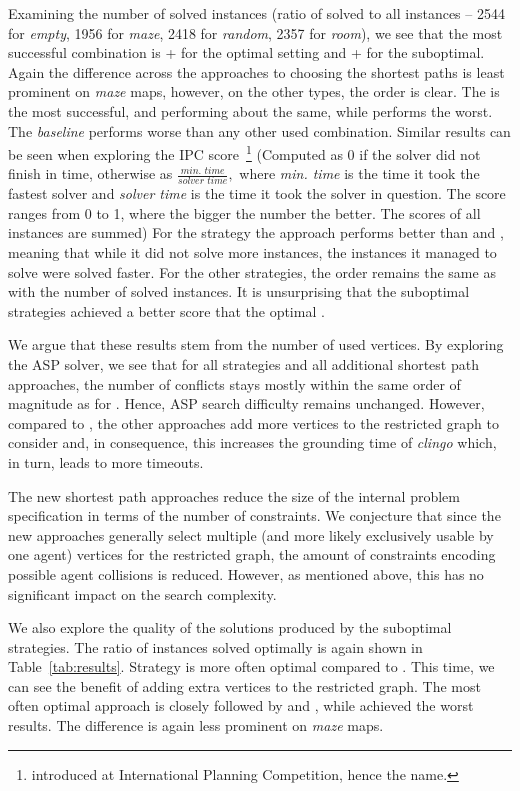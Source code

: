 Examining the number of solved instances (ratio of solved to all instances -- 2544 for \emph{empty}, 1956 for \emph{maze}, 2418 for \emph{random}, 2357 for \emph{room}), we see that the most successful combination is \ssp{} + \pss{} for the optimal setting and \ssc{} + \pss{} for the suboptimal. Again the difference across the approaches to choosing the shortest paths is least prominent on \emph{maze} maps, however, on the other types, the order is clear. The \pss{} is the most successful, \psd{} and \psr{} performing about the same, while \psa{} performs the worst. The \emph{baseline} \ssb{} performs worse than any other used combination.
Similar results can be seen when exploring the IPC score~\footnote{introduced at International Planning Competition, hence the name.} (Computed as 0 if the solver did not finish in time, otherwise as $\frac{\textit{min. time}}{\textit{solver time}},$ where \textit{min. time} is the time it took the fastest solver and \textit{solver time} is the time it took the solver in question. The score ranges from 0 to 1, where the bigger the number the better. The scores of all instances are summed) For the \ssp{} strategy the \psa{} approach performs better than \psd{} and \psr{}, meaning that while it did not solve more instances, the instances it managed to solve were solved faster. For the other strategies, the order remains the same as with the number of solved instances. It is unsurprising that the suboptimal strategies achieved a better score that the optimal \ssp{}.

We argue that these results stem from the number of used vertices. By exploring the ASP solver, we see that for all strategies and all additional shortest path approaches, the number of conflicts stays mostly within the same order of magnitude as for \pss{}. Hence, ASP search difficulty remains unchanged.
However, compared to \pss{}, the other approaches add more vertices to the restricted graph to consider and, in consequence, this increases the grounding time of \emph{clingo} which, in turn, leads to more timeouts.

The new shortest path approaches reduce the size of the internal problem specification in terms of the number of constraints.
We conjecture that since the new approaches generally select multiple (and more likely exclusively usable by one agent) vertices for the restricted graph, the amount of constraints encoding possible agent collisions is reduced. However, as mentioned above, this has no significant impact on the search complexity.

We also explore the quality of the solutions produced by the suboptimal strategies. The ratio of instances solved optimally is again shown in Table~\ref{tab:results}. Strategy \ssc{} is more often optimal compared to \ssm{}. This time, we can see the benefit of adding extra vertices to the restricted graph. The most often optimal approach is \psa{} closely followed by \psr{} and \psd{}, while \pss{} achieved the worst results. The difference is again less prominent on \emph{maze} maps.

